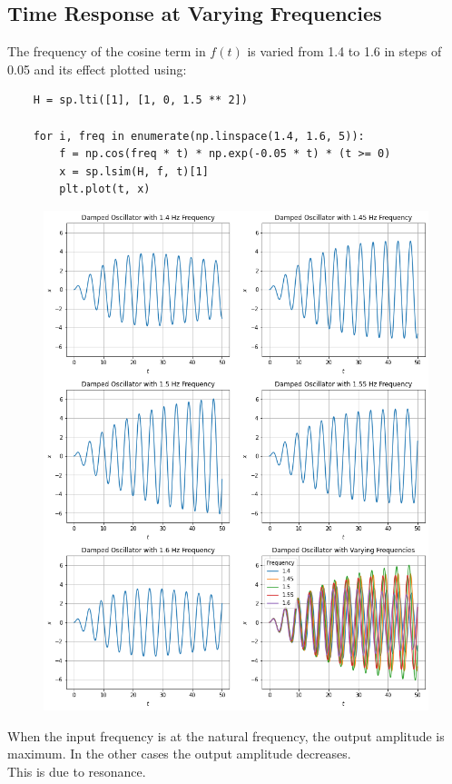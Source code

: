 \documentclass[12pt, a4paper]{article}
\begin{document}
\subsection{Time Response at Varying Frequencies}
The frequency of the cosine term in $f(t)$ is varied from 1.4 to 1.6 in steps of 0.05
and its effect plotted using:
\begin{lstlisting}
    H = sp.lti([1], [1, 0, 1.5 ** 2])

    for i, freq in enumerate(np.linspace(1.4, 1.6, 5)):
        f = np.cos(freq * t) * np.exp(-0.05 * t) * (t >= 0)
        x = sp.lsim(H, f, t)[1]
        plt.plot(t, x)
\end{lstlisting}
\begin{figure}[H]
    \centering
    \includegraphics[scale=0.55]{3.png}
\end{figure}

When the input frequency is at the natural frequency, the output amplitude is maximum.
In the other cases the output amplitude decreases. \\
This is due to resonance.
\end{document}
